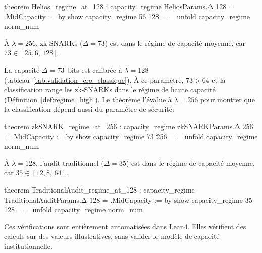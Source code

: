 \begin{sloppypar}
\begin{leancode}[caption={V\'erification du r\'egime Helios en Lean4}, label={lst:lean4_helios_regime}]
theorem Helios_regime_at_128 :
    capacity_regime HeliosParams.Δ 128 = .MidCapacity := by
  show capacity_regime 56 128 = _
  unfold capacity_regime
  norm_num
\end{leancode}

\begin{theorem}\label{thm:regime_snarks}
\`A $\lambda = 256$, zk-SNARKs ($\Delta = 73$) est
dans le r\'egime de capacit\'e moyenne, car $73 \in [25{,}6,\, 128]$.
\end{theorem}

La capacit\'e $\Delta = 73$~bits est calibr\'ee \`a $\lambda = 128$
(tableau~\ref{tab:validation_cro_classique}). \`A ce param\`etre, $73 > 64$ et la
classification range les zk-SNARKs dans le r\'egime de haute capacit\'e
(D\'efinition~\ref{def:regime_high}). Le
th\'eor\`eme l'\'evalue \`a $\lambda = 256$ pour montrer que la classification d\'epend
aussi du param\`etre de s\'ecurit\'e.

\begin{leancode}[caption={V\'erification du r\'egime zk-SNARKs en Lean4}, label={lst:lean4_zksnark_regime}]
theorem zkSNARK_regime_at_256 :
    capacity_regime zkSNARKParams.Δ 256 = .MidCapacity := by
  show capacity_regime 73 256 = _
  unfold capacity_regime
  norm_num
\end{leancode}

\begin{theorem}\label{thm:regime_audit}
\`A $\lambda = 128$, l'audit traditionnel ($\Delta = 35$) est dans le r\'egime de capacit\'e moyenne, car
$35 \in [12{,}8,\, 64]$.
\end{theorem}

\begin{leancode}[caption={V\'erification du r\'egime audit traditionnel en Lean4}, label={lst:lean4_audit_regime}]
theorem TraditionalAudit_regime_at_128 :
    capacity_regime TraditionalAuditParams.Δ 128 = .MidCapacity := by
  show capacity_regime 35 128 = _
  unfold capacity_regime
  norm_num
\end{leancode}

Ces v\'erifications sont enti\`erement automatis\'ees dans Lean4. Elles
v\'erifient des calculs sur des valeurs illustratives, sans valider le mod\`ele
de capacit\'e institutionnelle.
\end{sloppypar}

